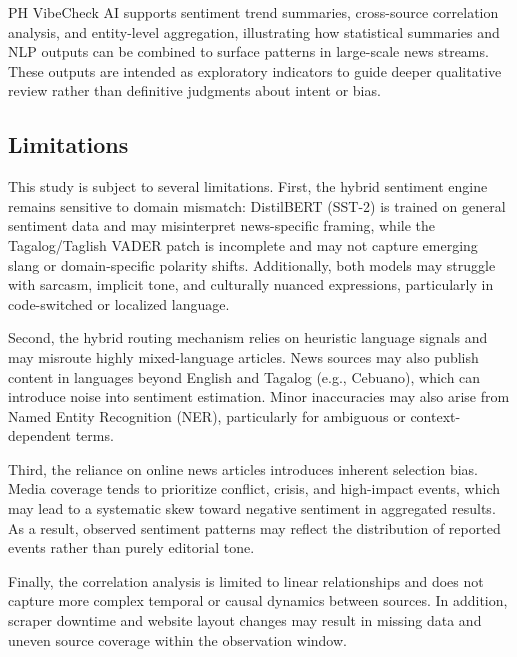 \documentclass[sigconf, nonacm]{acmart}
\begin{document}
PH VibeCheck AI supports sentiment trend summaries, cross-source correlation analysis, and entity-level aggregation, illustrating how statistical summaries and NLP outputs can be combined to surface patterns in large-scale news streams. These outputs are intended as exploratory indicators to guide deeper qualitative review rather than definitive judgments about intent or bias.

\subsection{Limitations}
This study is subject to several limitations. First, the hybrid sentiment engine remains sensitive to domain mismatch: DistilBERT (SST-2) is trained on general sentiment data and may misinterpret news-specific framing, while the Tagalog/Taglish VADER patch is incomplete and may not capture emerging slang or domain-specific polarity shifts. Additionally, both models may struggle with sarcasm, implicit tone, and culturally nuanced expressions, particularly in code-switched or localized language.

Second, the hybrid routing mechanism relies on heuristic language signals and may misroute highly mixed-language articles. News sources may also publish content in languages beyond English and Tagalog (e.g., Cebuano), which can introduce noise into sentiment estimation. Minor inaccuracies may also arise from Named Entity Recognition (NER), particularly for ambiguous or context-dependent terms.

Third, the reliance on online news articles introduces inherent selection bias. Media coverage tends to prioritize conflict, crisis, and high-impact events, which may lead to a systematic skew toward negative sentiment in aggregated results. As a result, observed sentiment patterns may reflect the distribution of reported events rather than purely editorial tone.

Finally, the correlation analysis is limited to linear relationships and does not capture more complex temporal or causal dynamics between sources. In addition, scraper downtime and website layout changes may result in missing data and uneven source coverage within the observation window.
\end{document}
